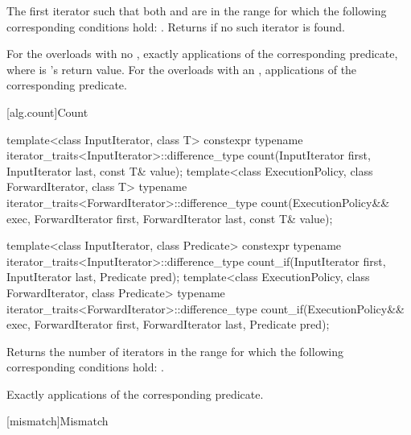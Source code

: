 \begin{itemdescr}
\pnum
\returns
The first iterator
such that both
and
are in
the range
for which
the following corresponding conditions hold:
.
Returns 
if no such iterator is found.

\pnum
\complexity
For the overloads with no , exactly
applications of the corresponding predicate, where  is
's
return value.  For the overloads with an ,
 applications of the corresponding predicate.
\end{itemdescr}

[alg.count]{Count}

%
%
\begin{itemdecl}
template<class InputIterator, class T>
  constexpr typename iterator_traits<InputIterator>::difference_type
    count(InputIterator first, InputIterator last, const T& value);
template<class ExecutionPolicy, class ForwardIterator, class T>
  typename iterator_traits<ForwardIterator>::difference_type
    count(ExecutionPolicy&& exec,
          ForwardIterator first, ForwardIterator last, const T& value);

template<class InputIterator, class Predicate>
  constexpr typename iterator_traits<InputIterator>::difference_type
    count_if(InputIterator first, InputIterator last, Predicate pred);
template<class ExecutionPolicy, class ForwardIterator, class Predicate>
  typename iterator_traits<ForwardIterator>::difference_type
    count_if(ExecutionPolicy&& exec,
             ForwardIterator first, ForwardIterator last, Predicate pred);
\end{itemdecl}

\begin{itemdescr}
\pnum
\effects
Returns the number of iterators
in the range 
for which the following corresponding
conditions hold:
.

\pnum
\complexity
Exactly
applications of the corresponding predicate.
\end{itemdescr}

[mismatch]{Mismatch}


